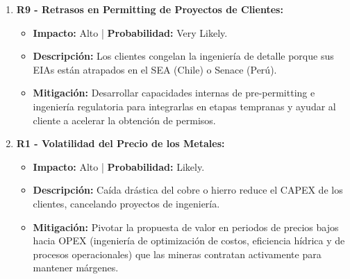 \begin{enumerate}
    \item \textbf{R9 - Retrasos en Permitting de Proyectos de Clientes:}
    \begin{itemize}
        \item \textbf{Impacto:} Alto | \textbf{Probabilidad:} Very Likely.
        \item \textbf{Descripción:} Los clientes congelan la ingeniería de detalle porque sus EIAs están atrapados en el SEA (Chile) o Senace (Perú).
        \item \textbf{Mitigación:} Desarrollar capacidades internas de pre-permitting e ingeniería regulatoria para integrarlas en etapas tempranas y ayudar al cliente a acelerar la obtención de permisos.
    \end{itemize}

    \item \textbf{R1 - Volatilidad del Precio de los Metales:}
    \begin{itemize}
        \item \textbf{Impacto:} Alto | \textbf{Probabilidad:} Likely.
        \item \textbf{Descripción:} Caída drástica del cobre o hierro reduce el CAPEX de los clientes, cancelando proyectos de ingeniería.
        \item \textbf{Mitigación:} Pivotar la propuesta de valor en periodos de precios bajos hacia OPEX (ingeniería de optimización de costos, eficiencia hídrica y de procesos operacionales) que las mineras contratan activamente para mantener márgenes.
    \end{itemize}
\end{enumerate}
